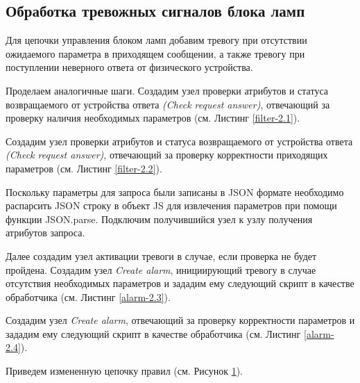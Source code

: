 \documentclass[a4paper,14pt]{extarticle}
\begin{document}
\subsection{Обработка тревожных сигналов блока ламп}

Для цепочки управления блоком ламп добавим тревогу при отсутствии ожидаемого параметра в приходящем сообщении, а также тревогу при поступлении неверного ответа от физического устройства.

Проделаем аналогичные шаги. Создадим узел проверки атрибутов и статуса возвращаемого от устройства ответа \textit{(Check request answer)}, отвечающий за проверку наличия необходимых параметров (см. Листинг \ref{filter-2.1}).



Создадим узел проверки атрибутов и статуса возвращаемого от устройства ответа \textit{(Check request answer)}, отвечающий за проверку корректности приходящих параметров (см. Листинг \ref{filter-2.2}).





Поскольку параметры для запроса были записаны в JSON формате необходимо распарсить JSON строку в объект JS для извлечения параметров при помощи функции JSON.parse. 
Подключим получившийся узел к узлу получения атрибутов запроса.

Далее создадим узел активации тревоги в случае, если проверка не будет пройдена. Создадим узел \textit{Create alarm}, инициирующий тревогу в случае отсутствия необходимых параметров и зададим ему следующий скрипт в качестве обработчика (см. Листинг \ref{alarm-2.3}).



Создадим узел \textit{Create alarm}, отвечающий за проверку корректности параметров и зададим ему следующий скрипт в качестве обработчика (см. Листинг \ref{alarm-2.4}).




Приведем измененную цепочку правил (см. Рисунок \ref{fig:chain-lamp}).
\begin{figure}[h!]
	\begin{minipage}[h!]{\linewidth}
	\end{minipage}
	
	\begin{minipage}[h!]{\linewidth}
	\end{minipage}
	\label{fig:chain-lamp}
\end{figure}
\end{document}
